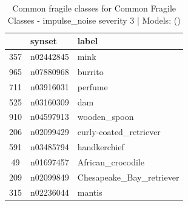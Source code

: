 \begin{table}
\caption{Common fragile classes for Common Fragile Classes - impulse_noise severity 3 | Models: ()}
\label{tab:Common Fragile Classes - impulse_noise severity 3_d41d8cd9}
\begin{tabular}{cll}
\toprule
 & synset & label \\
\midrule
357 & n02442845 & mink \\
965 & n07880968 & burrito \\
711 & n03916031 & perfume \\
525 & n03160309 & dam \\
910 & n04597913 & wooden_spoon \\
206 & n02099429 & curly-coated_retriever \\
591 & n03485794 & handkerchief \\
49 & n01697457 & African_crocodile \\
209 & n02099849 & Chesapeake_Bay_retriever \\
315 & n02236044 & mantis \\
\bottomrule
\end{tabular}
\end{table}
